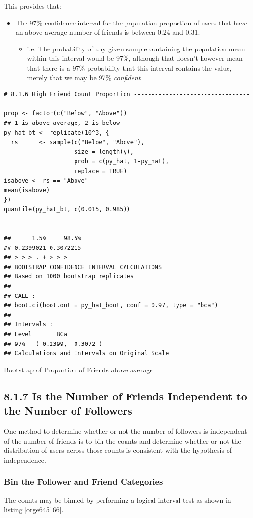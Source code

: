 \documentclass[11pt]{article}
\begin{document}
This provides that:
\begin{itemize}
\item The 97\% confidence interval for the population proportion of users that have an above average number of friends is between 0.24 and 0.31.
\begin{itemize}
\item i.e. The probability of any given sample containing the population mean within this interval would be 97\%, although  that doesn't however mean that there is a 97\% probability that this interval contains the value, merely that we may be 97\% \emph{confident}
\end{itemize}
\end{itemize}

\begin{listing}[htbp]
\begin{verbatim}
# 8.1.6 High Friend Count Proportion -------------------------------------------
prop <- factor(c("Below", "Above"))
## 1 is above average, 2 is below
py_hat_bt <- replicate(10^3, {
  rs      <- sample(c("Below", "Above"),
                    size = length(y),
                    prob = c(py_hat, 1-py_hat),
                    replace = TRUE)
isabove <- rs == "Above"
mean(isabove)
})
quantile(py_hat_bt, c(0.015, 0.985))


##      1.5%     98.5%
## 0.2399021 0.3072215
## > > > . + > > >
## BOOTSTRAP CONFIDENCE INTERVAL CALCULATIONS
## Based on 1000 bootstrap replicates
##
## CALL :
## boot.ci(boot.out = py_hat_boot, conf = 0.97, type = "bca")
##
## Intervals :
## Level       BCa
## 97%   ( 0.2399,  0.3072 )
## Calculations and Intervals on Original Scale
\end{verbatim}
\caption{\label{orgaf45f8c}Bootstrap of Proportion of Friends above average}
\end{listing}
\subsection{8.1.7 Is the Number of Friends Independent to the Number of Followers}
\label{sec:org6657e1e}
One method to determine whether or not the number of followers is independent of the number of friends is to bin the counts and determine whether or not the distribution of users across those counts is consistent with the hypothesis of independence.

\subsubsection{Bin the Follower and Friend Categories}
\label{sec:org7e3ad3b}
The counts may be binned by performing a logical interval test as shown in listing \ref{orge645166}.
\end{document}
